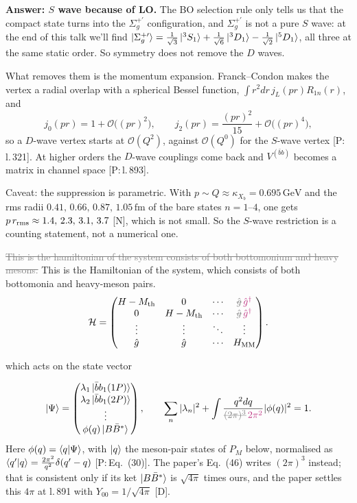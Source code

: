 \documentclass[11pt,a4paper]{article}
\newcommand{\tagP}[1]{\textcolor{blue!65!black}{\textsf{\small[P:\,#1]}}}
\newcommand{\tagD}{\textcolor{orange!85!black}{\textsf{\small[D]}}}
\newcommand{\tagN}{\textcolor{red!70!black}{\textsf{\small[N]}}}
\newcommand{\bbar}{\bar b b}
\newcommand{\BBst}{B\bar B^*}
\newcommand{\Mth}{M_{\rm th}}
\renewcommand{\VQQ}{V^{(\bar bb)}}
\renewcommand{\GeV}{\,\mathrm{GeV}}
\newcommand{\fm}{\,\mathrm{fm}}
\newcommand{\ai}[1]{\textcolor{aicolor}{#1}}
\newcommand{\aifix}[2]{\textcolor{gray}{\sout{#1}} \textcolor{aicolor}{#2}}
\newcommand{\aifixm}[2]{\textcolor{gray}{\text{\sout{$#1$}}}\,\textcolor{aicolor}{#2}}
\newcommand{\ai}[1]{#1}
\newcommand{\aifix}[2]{#2}
\newcommand{\aifixm}[2]{#2}
\newenvironment{aiadd}{\par}{\par}
\begin{document}
\begin{aiadd}
	\textbf{Answer: $S$ wave because of LO.} The BO selection rule only tells us that the compact state turns into the $\Sigma_g^{+\prime}$ configuration, and $\Sigma_g^{+\prime}$ is not a pure $S$ wave: at the end of this talk we'll find $\ket{\Sigma_g^{+\prime}}=\frac{1}{\sqrt3}\ket{^3S_1}+\frac{1}{\sqrt6}\ket{^3D_1}-\frac{1}{\sqrt2}\ket{^5D_1}$, all three at the same static order. So symmetry does not remove the $D$ waves.

	What removes them is the momentum expansion. Franck--Condon makes the vertex a radial overlap with a spherical Bessel function, $\int r^2dr\,j_L(pr)R_{1n}(r)$, and
	\[
		j_0(pr)=1+\mathcal O\big((pr)^2\big),\qquad j_2(pr)=\frac{(pr)^2}{15}+\mathcal O\big((pr)^4\big),
	\]
	so a $D$-wave vertex starts at $\mathcal O(Q^2)$, against $\mathcal O(Q^0)$ for the $S$-wave vertex \tagP{l.\,321}. At higher orders the $D$-wave couplings come back and $\VQQ$ becomes a matrix in channel space \tagP{l.\,893}.

	Caveat: the suppression is parametric. With $p\sim Q\approx\kappa_{X_b}=0.695\GeV$ and the rms radii $0.41,\,0.66,\,0.87,\,1.05\fm$ of the bare states $n=1$--$4$, one gets $p\,r_{\rm rms}\approx1.4,\,2.3,\,3.1,\,3.7$ \tagN, which is not small. So the $S$-wave restriction is a counting statement, not a numerical one.
\end{aiadd}

\aifix{This is the hamiltonian of the system consists of both bottomonium and heavy mesons.}{This is the Hamiltonian of the system, which consists of both bottomonia and heavy-meson pairs.}
\begin{equation}
	\mathcal H=\begin{pmatrix}
		H-\Mth & 0      & \cdots & \aifixm{\hat g}{\hat g^\dagger} \\
		0      & H-\Mth & \cdots & \aifixm{\hat g}{\hat g^\dagger} \\
		\vdots & \vdots & \ddots & \vdots     \\
		\hat g & \hat g & \cdots & H_{\rm MM}
	\end{pmatrix}.
	\label{draft:eq:H}
\end{equation}

which acts on the state vector

\begin{equation}
	\ket{\Psi}=\begin{pmatrix}\lambda_1\ket{\bbar_1(1P)}\\ \lambda_2\ket{\bbar_1(2P)}\\ \vdots\\ \phi(q)\ket{\BBst}\end{pmatrix},\qquad
	\sum_n|\lambda_n|^2+\int\frac{q^2dq}{\aifixm{(2\pi)^3}{2\pi^2}}|\phi(q)|^2=1 .
	\label{draft:eq:state}
\end{equation}
\ai{Here $\phi(q)=\braket{q|\Psi}$, with $\ket q$ the meson-pair states of $P_M$ below, normalised as $\braket{q'|q}=\frac{2\pi^2}{q^2}\delta(q'-q)$ \tagP{Eq.~(30)}. The paper's Eq.~(46) writes $(2\pi)^3$ instead; that is consistent only if its ket $\ket{\BBst}$ is $\sqrt{4\pi}$ times ours, and the paper settles this $4\pi$ at l.\,891 with $Y_{00}=1/\sqrt{4\pi}$ \tagD.}
\end{document}

